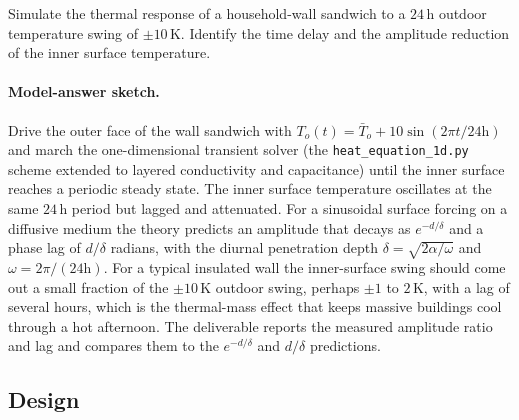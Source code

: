 \begin{exercise}
Simulate the thermal response of a household-wall sandwich to a
$24\,\text{h}$ outdoor temperature swing of $\pm 10\,\si{\kelvin}$.
Identify the time delay and the amplitude reduction of the inner
surface temperature.
\paragraph{Model-answer sketch.} Drive the outer face of the wall
sandwich with $T_o(t) = \bar{T}_o + 10\sin(2\pi t/24\text{h})$ and march
the one-dimensional transient solver (the \texttt{heat\_equation\_1d.py}
scheme extended to layered conductivity and capacitance) until the inner
surface reaches a periodic steady state. The inner surface temperature
oscillates at the same $24\,\text{h}$ period but lagged and attenuated.
For a sinusoidal surface forcing on a diffusive medium the theory
predicts an amplitude that decays as $e^{-d/\delta}$ and a phase lag of
$d/\delta$ radians, with the diurnal penetration depth $\delta =
\sqrt{2\alpha/\omega}$ and $\omega = 2\pi/(24\text{h})$. For a typical
insulated wall the inner-surface swing should come out a small fraction
of the $\pm 10\,\si{\kelvin}$ outdoor swing, perhaps $\pm 1$ to $2\,
\si{\kelvin}$, with a lag of several hours, which is the thermal-mass
effect that keeps massive buildings cool through a hot afternoon. The
deliverable reports the measured amplitude ratio and lag and compares
them to the $e^{-d/\delta}$ and $d/\delta$ predictions.
\end{exercise}

\subsection*{Design}


